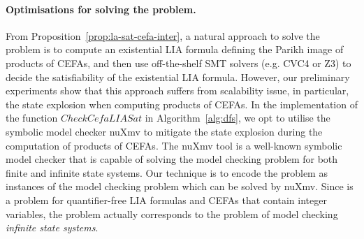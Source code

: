 \paragraph*{Optimisations for solving the {\lasat} problem.} From Proposition~\ref{prop:la-sat-cefa-inter}, a natural approach to solve the {\lasat} problem is to compute an existential LIA formula defining the Parikh image of products of CEFAs, and then use off-the-shelf SMT solvers (e.g. CVC4 or Z3) to decide the satisfiability of the existential LIA formula. %
However, our preliminary experiments show that this approach suffers from scalability issue, in particular, %
the state explosion when computing products of CEFAs.  %
In the implementation of the function $\mathit{CheckCefaLIASat}$ in Algorithm~\ref{alg:dfs},  we %
opt to utilise the symbolic model checker nuXmv \cite{nuxmv} to mitigate the state explosion during the computation of products of CEFAs. The nuXmv tool is a well-known symbolic model checker that is capable of solving the model checking problem for both finite and infinite state systems. Our technique is to encode the {\lasat} problem as instances of the model checking problem which can  be solved by %
nuXmv. Since  {\lasat} is a problem for quantifier-free LIA formulas and CEFAs that contain integer variables, the {\lasat} problem actually corresponds to the problem of model checking \emph{infinite state systems}. 
%
%



%
%
%


%
%
%
%
%
%
%
%
%
%


